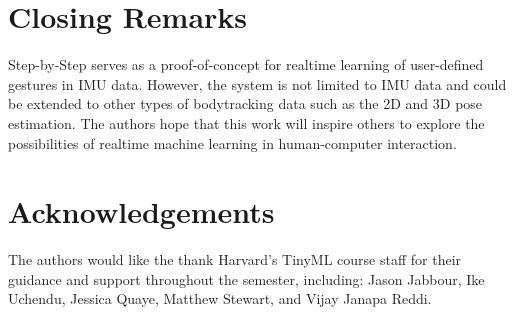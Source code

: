 \documentclass{article}
\begin{document}
\section{Closing Remarks}
Step-by-Step serves as a proof-of-concept for realtime learning of user-defined gestures in IMU data. However, the system is not limited to IMU data and could be extended to other types of bodytracking data such as the 2D and 3D pose estimation. The authors hope that this work will inspire others to explore the possibilities of realtime machine learning in human-computer interaction.

\section{Acknowledgements}
The authors would like the thank Harvard's TinyML course staff for their guidance and support throughout the semester, including: Jason Jabbour, Ike Uchendu, Jessica Quaye, Matthew Stewart, and Vijay Janapa Reddi.



\end{document}
